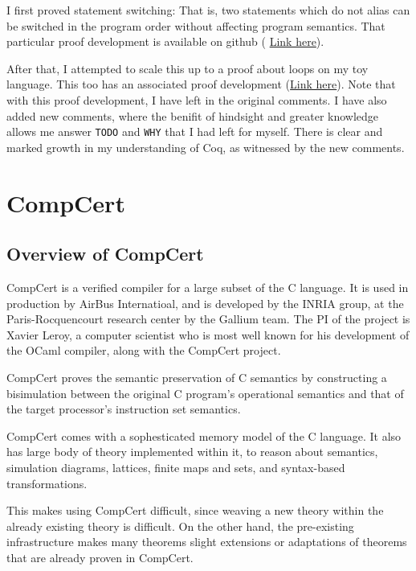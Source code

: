 \documentclass{article}
\begin{document}
I first proved statement switching: That is, two statements which do not alias can be switched in the program
order without affecting program semantics. That particular proof development is available on github (
\href{https://bollu.github.io/dependence-analysis-coq/dependence-2-stmts/doc/html/proof.html}{Link here}).

After that, I attempted to scale this up to a proof about loops on my toy language. This too has an
associated proof development (\href{file:///home/bollu/work/dependence-analysis-coq/dependence-loop/doc/html/proof.html}{Link here}).
Note that with this proof development, I have left in the original comments. I have also added new comments, where
the benifit of hindsight and greater knowledge allows me answer \texttt{TODO} and \texttt{WHY} that I had left
for myself. There is clear and marked growth in my understanding of Coq, as witnessed by the new comments.

\section{CompCert}

\subsection{Overview of CompCert}
CompCert is a verified compiler for a large subset of the C language. It is used in production by AirBus Internatioal,
and is developed by the INRIA group, at the Paris-Rocquencourt research center by the Gallium team.
The PI of the project is Xavier Leroy, a computer scientist who is most well known for his development of the OCaml compiler,
along with the CompCert project.

CompCert proves the semantic preservation of C semantics by constructing a bisimulation between the original C program's
operational semantics and that of the target processor's instruction set semantics.

CompCert comes with a sophesticated memory model of the C language. It also has large body of theory implemented within it,
to reason about semantics, simulation diagrams, lattices, finite maps and sets, and syntax-based transformations.

This makes using CompCert difficult, since weaving a new theory within the already existing theory is difficult. On the
other hand, the pre-existing infrastructure makes many theorems slight extensions or adaptations of theorems that are
already proven in CompCert.
  
\end{document}
